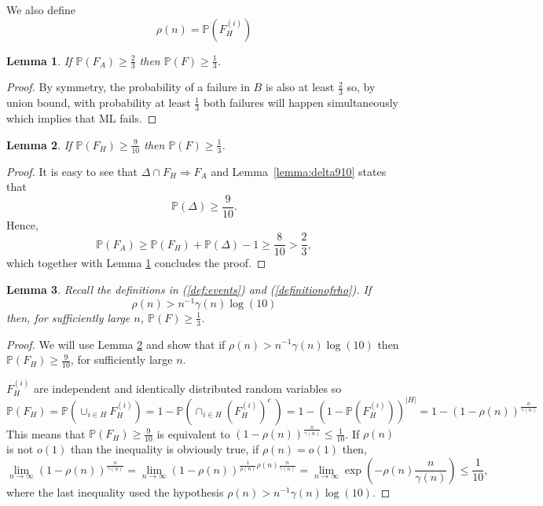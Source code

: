 \documentclass[english]{article}
\newtheorem{lemma}{Lemma}
\newcommand{\1}{\textbf{1}}
\newcommand{\p}{\mathbb{P}}
\begin{document}
We also define
\begin{equation}\label{definitionofrho}
\rho(n) = \p\left( F_H^{(i)} \right)
\end{equation}

\begin{lemma}\label{lemma_FAF}
If $\p\left(F_A\right)\geq \frac23$ then $\p\left( F \right)\geq \frac13$.
\end{lemma}
\begin{proof}
By symmetry, the probability of a failure in $B$ is also at least $\frac23$ so, by union bound, with probability at least $\frac13$ both failures will happen simultaneously which implies that ML fails.
\end{proof}




\begin{lemma}\label{lemma:reverseunionboundH}
If $\p\left( F_H\right) \geq \frac9{10}$ then $\p\left( F \right)\geq \frac13$.
\end{lemma}
\begin{proof}
It is easy to see that $\Delta \cap F_H \Rightarrow F_A$ and
Lemma~\ref{lemma:delta910} states that
\begin{equation}
\p\left( \Delta\right) \geq \frac9{10}.
\end{equation}
Hence,
\[
\p\left(F_A\right) \geq \p\left(F_H\right) + \p\left(\Delta\right) - 1 \geq \frac8{10} > \frac23,
\]
which together with Lemma \ref{lemma_FAF} concludes the proof.
\end{proof}

\begin{lemma}\label{lemma:controlrhoisenough}
Recall the definitions in (\ref{def:events}) and (\ref{definitionofrho}). If $$\rho(n) > n^{-1}\gamma(n)\log(10)$$ then, for sufficiently large $n$, $\p\left( F \right)\geq \frac13$.
\end{lemma}

\begin{proof} We will use Lemma \ref{lemma:reverseunionboundH} and show that if $\rho(n) > n^{-1}\gamma(n)\log(10)$ then $\p\left( F_H\right) \geq \frac9{10}$, for sufficiently large $n$.

$F_H^{(i)}$ are independent and identically distributed random variables so
\[
\p\left(F_H\right) = \p\left(\cup_{i\in H} F_H^{(i)}\right) = 1-\p\left(\cap_{i\in H} \left(F_H^{(i)}\right)^c\ \right) = 1-\left( 1 - \p\left(F_H^{(i)}\right) \right)^{|H|} = 1-\left( 1 - \rho(n) \right)^{\frac{n}{\gamma(n)}}
\]
This means that $\p\left( F_H\right) \geq \frac9{10}$ is equivalent to $\left( 1 - \rho(n) \right)^{\frac{n}{\gamma(n)}} \leq \frac1{10}$. If $\rho(n)$ is not $o(1)$ than the inequality is obviously true, if $\rho(n) = o(1)$ then,
\[
\lim_{n\to\infty} \left( 1 - \rho(n) \right)^{\frac{n}{\gamma(n)}} = \lim_{n\to\infty}\left( 1 - \rho(n) \right)^{\frac1{\rho(n)}\rho(n)\frac{n}{\gamma(n)}} = \lim_{n\to\infty}\exp\left( - \rho(n)\frac{n}{\gamma(n)} \right) \leq \frac1{10},
\]
where the last inequality used the hypothesis $\rho(n) > n^{-1}\gamma(n)\log(10)$.
\end{proof}
\end{document}
